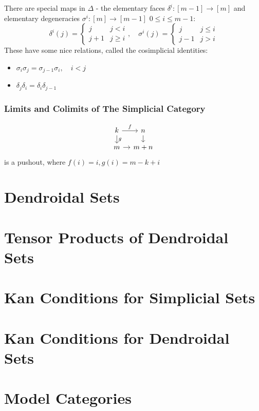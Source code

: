 There are special maps in $\Delta$ - the elementary faces $\delta^i: [m - 1]\to [m]$ and elementary degeneracies $\sigma^i: [m] \to [m-1]$ $0 \leq i \leq m - 1$:
\[\delta^i(j) = 
\begin{cases}
    j & j < i \\
    j + 1 & j \geq i
\end{cases}, \quad \sigma^i(j) = 
\begin{cases}
    j & j \leq i \\
    j - 1 & j > i
\end{cases}
\]
These have some nice relations, called the cosimplicial identities:
\begin{itemize}
    \item $\sigma_i\sigma_j = \sigma_{j-1}\sigma_i, \quad i < j$
    \item $\delta_j \delta_i =\delta_i\delta_{j-1}$
\end{itemize}

\subsubsection{Limits and Colimits of The Simplicial Category}
\[\begin{tikzcd}[column sep=1em, row sep=1em]
    k \arrow[r, "f"] \arrow[d, "g"] & n \arrow[d] \\
    m \arrow[r] & m + n
\end{tikzcd}\]
is a pushout, where $f(i) = i, g(i) = m - k + i$

\section{Dendroidal Sets}

\section{Tensor Products of Dendroidal Sets}

\section{Kan Conditions for Simplicial Sets}

\section{Kan Conditions for Dendroidal Sets}

\section{Model Categories}

